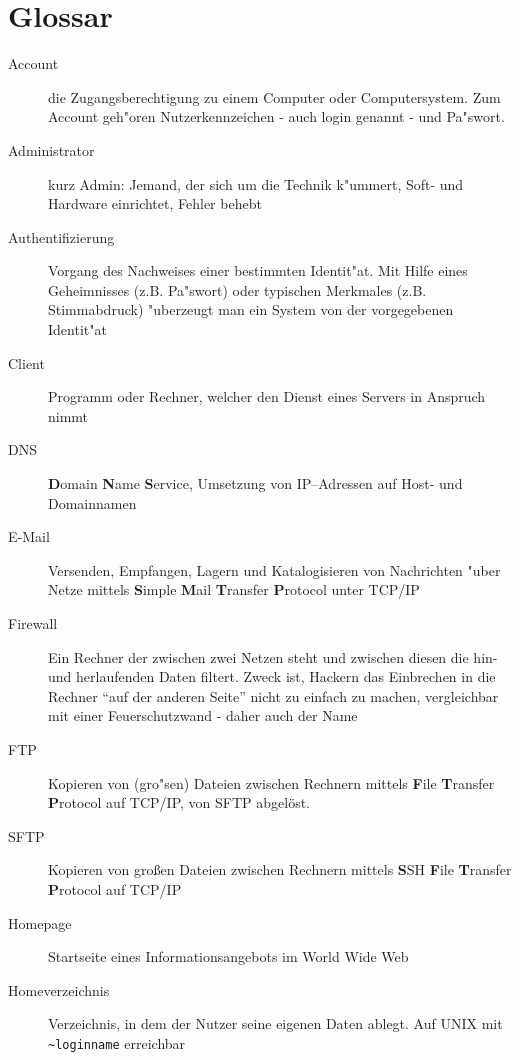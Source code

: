 \section{Glossar}
\begin{description}
  \item[Account] die Zugangsberechtigung zu einem Computer oder
    Computersystem. Zum Account geh"oren Nutzerkennzeichen - auch login genannt
    - und Pa"swort.
  \item[Administrator] kurz Admin: Jemand, der sich um die Technik k"ummert,
    Soft- und Hardware einrichtet, Fehler behebt
  \item[Authentifizierung] Vorgang des Nachweises einer bestimmten
    Identit"at. Mit Hilfe eines Geheimnisses (z.B. Pa"swort) oder typischen
    Merkmales (z.B. Stimmabdruck) "uberzeugt man ein System von der
    vorgegebenen Identit"at
  \item[Client] Programm oder Rechner, welcher den Dienst eines Servers in
    Anspruch nimmt
  \item[DNS] \textbf{D}omain \textbf{N}ame \textbf{S}ervice, Umsetzung von
    IP--Adressen auf Host- und Domainnamen
  \item[E-Mail] Versenden, Empfangen, Lagern und Katalogisieren von
    Nachrichten "uber Netze mittels \textbf{S}imple \textbf{M}ail
    \textbf{T}ransfer \textbf{P}rotocol unter TCP/IP 
  \item[Firewall] Ein Rechner der zwischen zwei Netzen steht und zwischen
    diesen die hin- und herlaufenden Daten filtert. Zweck ist, Hackern das
    Einbrechen in die Rechner "`auf der anderen Seite"' nicht zu einfach zu
    machen, vergleichbar mit einer Feuerschutzwand - daher auch der Name
  \item[FTP] Kopieren von (gro"sen) Dateien zwischen Rechnern mittels 
      \textbf{F}ile \textbf{T}ransfer \textbf{P}rotocol auf TCP/IP,
      von SFTP abgelöst.
  \item[SFTP] Kopieren von großen Dateien zwischen Rechnern mittels
    \textbf{S}SH \textbf{F}ile  \textbf{T}ransfer \textbf{P}rotocol
    auf TCP/IP
  \item[Homepage] Startseite eines Informationsangebots im World Wide Web
  \item[Homeverzeichnis] Verzeichnis, in dem der Nutzer seine eigenen Daten
    ablegt. Auf UNIX mit \verb#~loginname# erreichbar

\end{description}
